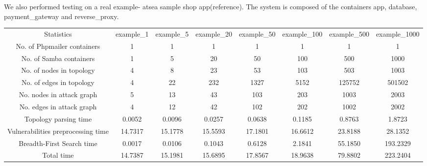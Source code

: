 \documentclass[letterpaper, 10 pt, conference]{ieeeconf}  %
\begin{document}
We also performed testing on a real example- atsea sample shop app(reference). The system is composed of the containers app, database, payment_gateway and reverse_proxy.


\begin{table*}[t]
\begin{center}
	\begin{tabular}{ |c|c|c|c|c|c|c|c| } 
		\hline
		Statistics & example\_1 & example\_5 & example\_20 & example\_50 & example\_100 & example\_500 & example\_1000 \\ 
		
		No. of Phpmailer containers & 1 & 1 & 1 & 1 & 1 & 1 & 1 \\ 
		
		No. of Samba containers & 1 & 5 & 20 & 50 & 100 & 500 & 1000 \\ 
		
		No. of nodes in topology & 4 & 8 & 23 & 53 & 103 & 503 & 1003\\ 
		
	    No. of edges in topology & 4 & 22 & 232 & 1327 & 5152 & 125752 & 501502 \\ 
		
		No. nodes in attack graph & 5 & 13 & 43 & 103 & 203 & 1003 & 2003 \\ 
		
		No. edges in attack graph & 4 & 12 & 42 & 102 & 202 & 1002 & 2002 \\ 
		
		Topology parsing time & 0.0052 & 0.0096 & 0.0257 & 0.0638 & 0.1185 & 0.8763 & 1.8723 \\ 
		
		Vulnerabilities preprocessing time & 14.7317 & 15.1778 & 15.5593 & 17.1801 & 16.6612 & 23.8188 & 28.1352 \\ 
		
		Breadth-First Search time & 0.0017 & 0.0106 & 0.1043 & 0.6128 & 2.1841 & 55.1850 & 193.2329 \\ 
		
		Total time & 14.7387 & 15.1981 & 15.6895 & 17.8567 & 18.9638 & 79.8802 & 223.2404 \\ 
		\hline
	\end{tabular}
\end{center}


\end{table*}
\end{document}
